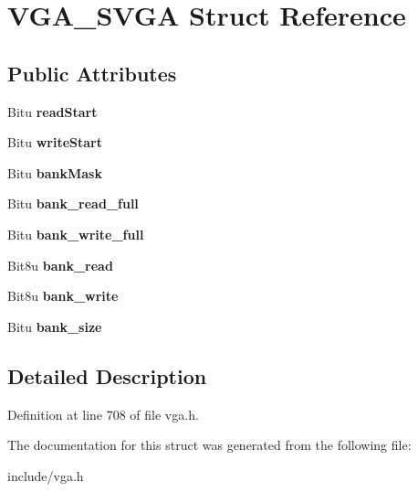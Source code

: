 \hypertarget{structVGA__SVGA}{\section{V\-G\-A\-\_\-\-S\-V\-G\-A Struct Reference}
\label{structVGA__SVGA}
}
\subsection*{Public Attributes}
\begin{DoxyCompactItemize}
\item 
\hypertarget{structVGA__SVGA_a12feba28b67c048513e66e201fac71dc}{Bitu {\bfseries read\-Start}}\label{structVGA__SVGA_a12feba28b67c048513e66e201fac71dc}

\item 
\hypertarget{structVGA__SVGA_a6dd88ed646507e88dec8ea6f36168810}{Bitu {\bfseries write\-Start}}\label{structVGA__SVGA_a6dd88ed646507e88dec8ea6f36168810}

\item 
\hypertarget{structVGA__SVGA_ac754dc12435255d72973c78b3130f611}{Bitu {\bfseries bank\-Mask}}\label{structVGA__SVGA_ac754dc12435255d72973c78b3130f611}

\item 
\hypertarget{structVGA__SVGA_a709b930e64d2c6a7f97f2a707a8c6baa}{Bitu {\bfseries bank\-\_\-read\-\_\-full}}\label{structVGA__SVGA_a709b930e64d2c6a7f97f2a707a8c6baa}

\item 
\hypertarget{structVGA__SVGA_ab222686ed91393c5f22fcbc2683a9afb}{Bitu {\bfseries bank\-\_\-write\-\_\-full}}\label{structVGA__SVGA_ab222686ed91393c5f22fcbc2683a9afb}

\item 
\hypertarget{structVGA__SVGA_a97458414e7c3e11d66fe7a04442ee044}{Bit8u {\bfseries bank\-\_\-read}}\label{structVGA__SVGA_a97458414e7c3e11d66fe7a04442ee044}

\item 
\hypertarget{structVGA__SVGA_ad9e4750a5b4addc6f5b5bd332cec147f}{Bit8u {\bfseries bank\-\_\-write}}\label{structVGA__SVGA_ad9e4750a5b4addc6f5b5bd332cec147f}

\item 
\hypertarget{structVGA__SVGA_a3182c5e72fb68b0c125e9f350de5a2e3}{Bitu {\bfseries bank\-\_\-size}}\label{structVGA__SVGA_a3182c5e72fb68b0c125e9f350de5a2e3}

\end{DoxyCompactItemize}


\subsection{Detailed Description}


Definition at line 708 of file vga.\-h.



The documentation for this struct was generated from the following file\-:\begin{DoxyCompactItemize}
\item 
include/vga.\-h\end{DoxyCompactItemize}
